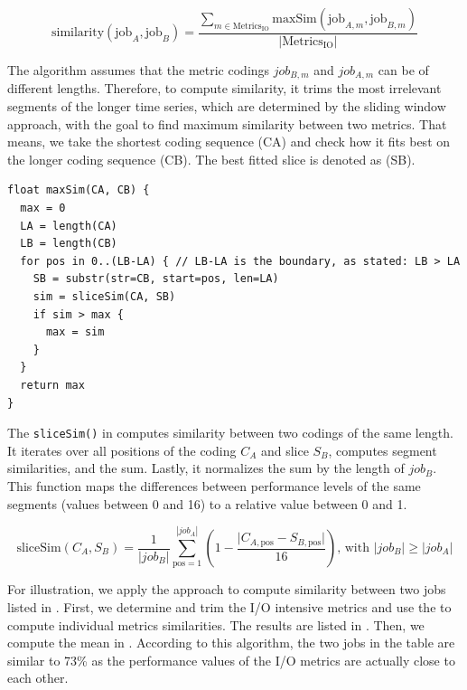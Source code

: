 \documentclass{jhps}
\begin{document}
\begin{equation}
  \text{similarity}\left(\text{job}_{A},\text{job}_{B} \right) = \frac{ \sum_{m \in \text{Metrics}_{\text{IO}}}^{} {\text{maxSim} \left( \text{job}_{A,m}, \text{job}_{B,m} \right)}}{|\text{Metrics}_{\text{IO}}|}
  \label{eq:hexn}
\end{equation}

The algorithm assumes that the metric codings $job_{B,m}$ and $job_{A,m}$ can be of different lengths.
Therefore, to compute similarity, it trims the most irrelevant segments of the longer time series, which are determined by the sliding window approach, with the goal to find maximum similarity between two metrics.
That means, we take the shortest coding sequence (CA) and check how it fits best on the longer coding sequence (CB).
The best fitted slice is denoted as (SB).

\begin{lstlisting}[caption={Pseudo code of the maxSim() function}]
float maxSim(CA, CB) {
  max = 0
  LA = length(CA)
  LB = length(CB)
  for pos in 0..(LB-LA) { // LB-LA is the boundary, as stated: LB > LA
    SB = substr(str=CB, start=pos, len=LA)
    sim = sliceSim(CA, SB)
    if sim > max {
      max = sim
    }
  }
  return max
}
\end{lstlisting}

The \texttt{sliceSim()} in  computes similarity between two codings of the same length.
It iterates over all positions of the coding $C_A$ and slice $S_B$, computes segment similarities, and the sum.
Lastly, it normalizes the sum by the length of $job_B$.
This function maps the differences between performance levels of the same segments (values between 0 and 16) to a relative value between 0 and 1.

\begin{equation}
	\text{sliceSim}\left(C_{A},S_{B}\right) = \frac{1}{|job_B|}\sum_{\text{pos}=1}^{|job_A|} \left(1 - \frac{\vert C_{A,\text{pos}}-S_{B,\text{pos}} \vert }{16}\right)\text{, with }|job_{B}| \geq |job_{A}| \label{eq:slicesim}
\end{equation}

For illustration, we apply the approach to compute similarity between two jobs listed in .
First, we determine and trim the I/O intensive metrics and use the  to compute individual metrics similarities.
The results are listed in .
Then, we compute the mean in .
According to this algorithm, the two jobs in the table are similar to 73\% as the performance values of the I/O metrics are actually close to each other.
\end{document}
